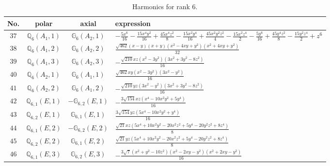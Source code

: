 \documentclass[fleqn,8pt,landscape]{jsarticle}
\begin{document}
\begin{table}[ht!]
\begin{center}
\caption{Harmonics for rank 6.}
\renewcommand{\arraystretch}{1.3}
\begin{tabular}{cccl} \hline \hline
No. & polar & axial & expression \\ \hline
$ 37 $ & $ \mathbb{Q}_{6}(A_{1},1) $ & $ \mathbb{G}_{6}(A_{2},1) $ & $ - \frac{5 x^{6}}{16} - \frac{15 x^{4} y^{2}}{16} + \frac{45 x^{4} z^{2}}{8} - \frac{15 x^{2} y^{4}}{16} + \frac{45 x^{2} y^{2} z^{2}}{4} - \frac{15 x^{2} z^{4}}{2} - \frac{5 y^{6}}{16} + \frac{45 y^{4} z^{2}}{8} - \frac{15 y^{2} z^{4}}{2} + z^{6} $ \\
$ 38 $ & $ \mathbb{Q}_{6}(A_{1},2) $ & $ \mathbb{G}_{6}(A_{2},2) $ & $ \frac{\sqrt{462} \left(x - y\right) \left(x + y\right) \left(x^{2} - 4 x y + y^{2}\right) \left(x^{2} + 4 x y + y^{2}\right)}{32} $ \\
$ 39 $ & $ \mathbb{Q}_{6}(A_{1},3) $ & $ \mathbb{G}_{6}(A_{2},3) $ & $ - \frac{\sqrt{210} x z \left(x^{2} - 3 y^{2}\right) \left(3 x^{2} + 3 y^{2} - 8 z^{2}\right)}{16} $ \\
$ 40 $ & $ \mathbb{Q}_{6}(A_{2},1) $ & $ \mathbb{G}_{6}(A_{1},1) $ & $ \frac{\sqrt{462} x y \left(x^{2} - 3 y^{2}\right) \left(3 x^{2} - y^{2}\right)}{16} $ \\
$ 41 $ & $ \mathbb{Q}_{6}(A_{2},2) $ & $ \mathbb{G}_{6}(A_{1},2) $ & $ - \frac{\sqrt{210} y z \left(3 x^{2} - y^{2}\right) \left(3 x^{2} + 3 y^{2} - 8 z^{2}\right)}{16} $ \\
$ 42 $ & $ \mathbb{Q}_{6,1}(E,1) $ & $ -\mathbb{G}_{6,2}(E,1) $ & $ - \frac{3 \sqrt{154} x z \left(x^{4} - 10 x^{2} y^{2} + 5 y^{4}\right)}{16} $ \\
$ 43 $ & $ \mathbb{Q}_{6,2}(E,1) $ & $ \mathbb{G}_{6,1}(E,1) $ & $ \frac{3 \sqrt{154} y z \left(5 x^{4} - 10 x^{2} y^{2} + y^{4}\right)}{16} $ \\
$ 44 $ & $ \mathbb{Q}_{6,1}(E,2) $ & $ -\mathbb{G}_{6,2}(E,2) $ & $ \frac{\sqrt{21} x z \left(5 x^{4} + 10 x^{2} y^{2} - 20 x^{2} z^{2} + 5 y^{4} - 20 y^{2} z^{2} + 8 z^{4}\right)}{8} $ \\
$ 45 $ & $ \mathbb{Q}_{6,2}(E,2) $ & $ \mathbb{G}_{6,1}(E,2) $ & $ \frac{\sqrt{21} y z \left(5 x^{4} + 10 x^{2} y^{2} - 20 x^{2} z^{2} + 5 y^{4} - 20 y^{2} z^{2} + 8 z^{4}\right)}{8} $ \\
$ 46 $ & $ \mathbb{Q}_{6,1}(E,3) $ & $ \mathbb{G}_{6,2}(E,3) $ & $ - \frac{3 \sqrt{7} \left(x^{2} + y^{2} - 10 z^{2}\right) \left(x^{2} - 2 x y - y^{2}\right) \left(x^{2} + 2 x y - y^{2}\right)}{16} $ \\

\end{tabular}
\end{center}
\end{table}
\end{document}
